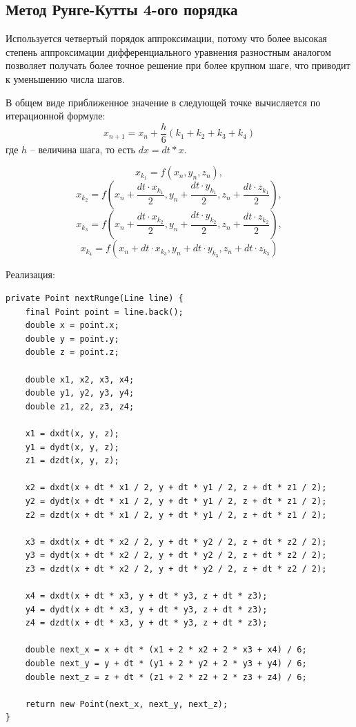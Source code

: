 \documentclass[12pt]{article}
\begin{document}
\subsection{Метод Рунге-Кутты 4-ого порядка}

Используется четвертый порядок аппроксимации, потому что более высокая степень аппроксимации дифференциального уравнения разностным аналогом позволяет получать более точное решение при более крупном шаге, что приводит к уменьшению числа шагов.

В общем виде приближенное значение в следующей точке вычисляется по итерационной формуле:
\begin{equation*}
x_{n+1} = x_n + \frac{h}{6}(k_1+k_2+k_3+k_4)
\end{equation*}
где $h$ -- величина шага, то есть $dx = dt * x$.

\[x_{k_1} = f(x_n, y_n, z_n), \]
\[ x_{k_2} = f(x_n + \frac{dt \cdot x_{k_1}}{2}, y_n + \frac{dt \cdot y_{k_1}}{2}, z_n + \frac{dt \cdot z_{k_1}}{2}), \]
\[x_{k_3} = f(x_n + \frac{dt \cdot x_{k_2}}{2}, y_n + \frac{dt \cdot y_{k_2}}{2}, z_n + \frac{dt \cdot z_{k_2}}{2}),\]
\[x_{k_4} = f(x_n + dt \cdot x_{k_3}, y_n + dt \cdot y_{k_3}, z_n + dt \cdot z_{k_3})\]

Реализация:
\begin{lstlisting}
private Point nextRunge(Line line) {
    final Point point = line.back();
    double x = point.x;
    double y = point.y;
    double z = point.z;

    double x1, x2, x3, x4;
    double y1, y2, y3, y4;
    double z1, z2, z3, z4;

    x1 = dxdt(x, y, z);
    y1 = dydt(x, y, z);
    z1 = dzdt(x, y, z);

    x2 = dxdt(x + dt * x1 / 2, y + dt * y1 / 2, z + dt * z1 / 2);
    y2 = dydt(x + dt * x1 / 2, y + dt * y1 / 2, z + dt * z1 / 2);
    z2 = dzdt(x + dt * x1 / 2, y + dt * y1 / 2, z + dt * z1 / 2);

    x3 = dxdt(x + dt * x2 / 2, y + dt * y2 / 2, z + dt * z2 / 2);
    y3 = dydt(x + dt * x2 / 2, y + dt * y2 / 2, z + dt * z2 / 2);
    z3 = dzdt(x + dt * x2 / 2, y + dt * y2 / 2, z + dt * z2 / 2);

    x4 = dxdt(x + dt * x3, y + dt * y3, z + dt * z3);
    y4 = dydt(x + dt * x3, y + dt * y3, z + dt * z3);
    z4 = dzdt(x + dt * x3, y + dt * y3, z + dt * z3);

    double next_x = x + dt * (x1 + 2 * x2 + 2 * x3 + x4) / 6;
    double next_y = y + dt * (y1 + 2 * y2 + 2 * y3 + y4) / 6;
    double next_z = z + dt * (z1 + 2 * z2 + 2 * z3 + z4) / 6;

    return new Point(next_x, next_y, next_z);
}
\end{lstlisting}
\end{document}
